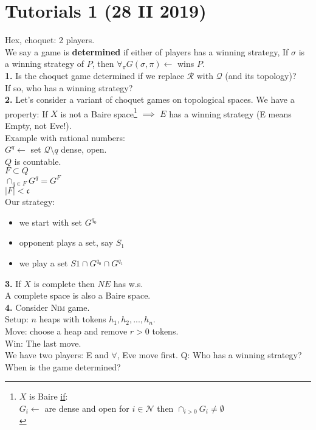 \section{Tutorials 1 (28 II 2019)}
Hex, choquet: 2 players.\\
We say a game is \textbf{determined} if either of players has a winning
strategy,
If $\sigma$ is a winning strategy of $P$, then $\forall_{\pi} G(\sigma, \pi) \leftarrow$ wins $P$.\\

\noindent
\textbf{1.} Is the choquet game determined if we replace $\mathcal{R}$ with $\mathcal{Q}$ (and its topology)?\\
If so, who has a winning strategy?\\

\noindent
\textbf{2.} Let's consider a variant of choquet games on topological spaces. We have a property:
If $X$ is not a Baire space\footnote{$X$ is Baire \underline{if}:\\
$G_i \leftarrow$ are dense and open for $i \in \mathcal{N}$
then $\cap_{i > 0} G_i \neq \emptyset$\\
}
$\implies$ $E$ has a winning strategy (E means Empty, not Eve!).\\
Example with rational numbers:\\
$G^q \leftarrow$ set $\mathcal{Q} \setminus {q}$ dense, open.\\
$Q$ is countable.\\
$F \subset Q$\\
$\cap_{q \in F} G^q = G^F$\\
$|F| < \mathfrak{c}$\\
Our strategy:
\begin{itemize}
	\item we start with set $G^{q_0}$
	\item opponent plays a set, say $S_1$
	\item we play a set $S1 \cap G^{q_0} \cap G^{q_1}$
\end{itemize}

\noindent
\textbf{3.} If $X$ is complete then $NE$ has w.s.\\
A complete space is also a Baire space.\\

\noindent
\textbf{4.} Consider \textsc{Nim} game.\\
Setup: $n$ heaps with tokens $h_1, h_2, ..., h_n$.\\
Move: choose a heap and remove $r > 0$ tokens.\\
Win: The last move.\\
We have two players: \textsc{E} and $\forall$, Eve move first.
Q: Who has a winning strategy? When is the game determined?\\

